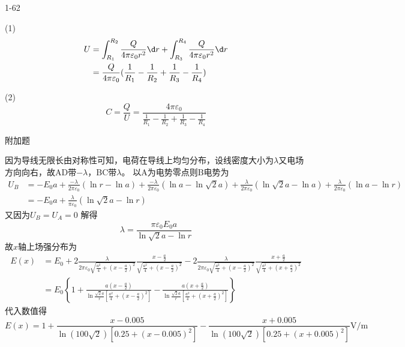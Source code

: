 \documentclass{phyasgn}
\begin{document}
{\heiti\color{red} 1-62}
\begin{sol}
(1)
$$\begin{aligned}
    U&=\int_{R_1}^{R_2}\frac{Q}{4\pi\varepsilon_0r^2}\d r+\int_{R_3}^{R_4}\frac{Q}{4\pi\varepsilon_0r^2}\d r\\
    &=\frac{Q}{4\pi\varepsilon_0}(\frac{1}{R_1}-\frac{1}{R_2}+\frac{1}{R_3}-\frac{1}{R_4})
\end{aligned}$$\par
(2)$$
C=\frac{Q}{U}=\frac{4\pi\varepsilon_0}{\frac{1}{R_1}-\frac{1}{R_2}+\frac{1}{R_3}-\frac{1}{R_4}}
$$
\end{sol}\par

{\heiti\color{red} 附加题}
\begin{sol}
\begin{figure}[!h]
\end{figure}
因为导线无限长由对称性可知，电荷在导线上均匀分布，设线密度大小为$\lambda$又电场方向向右，故AD带$-\lambda$，BC带$\lambda$。
以A为电势零点则B电势为
$$\begin{aligned}
    U_B&=-E_0a+\frac{-\lambda}{2\pi\varepsilon_0}(\ln r-\ln a)+\frac{-\lambda}{2\pi\varepsilon_0}(\ln a-\ln \sqrt{2}a)+\frac{\lambda}{2\pi\varepsilon_0}(\ln \sqrt{2}a-\ln a)+\frac{\lambda}{2\pi\varepsilon_0}(\ln a-\ln r)\\
    &=-E_0a+\frac{\lambda}{\pi\varepsilon_0}(\ln\sqrt{2}a-\ln r)
\end{aligned}$$
又因为$U_B=U_A=0$
解得$$
\lambda=\frac{\pi\varepsilon_0E_0a}{\ln\sqrt{2}a-\ln r}
$$
故$x$轴上场强分布为
$$\begin{aligned}
    E(x)&=E_0+2\frac{\lambda}{2\pi\varepsilon_0\sqrt{\frac{a^2}{4}+(x-\frac{a}{2})^2}}\frac{x-\frac{a}{2}}{\sqrt{\frac{a^2}{4}+(x-\frac{a}{2})^2}}-2\frac{\lambda}{2\pi\varepsilon_0\sqrt{\frac{a^2}{4}+(x-\frac{a}{2})^2}}\frac{x+\frac{a}{2}}{\sqrt{\frac{a^2}{4}+(x+\frac{a}{2})^2}}\\
    &=E_0\left \{ 1+\frac{a(x-\frac{a}{2}) }{\ln \frac{\sqrt{2}a }{r}[\frac{a^2}{4}+(x-\frac{a}{2} )^2]  } -\frac{a(x+\frac{a}{2}) }{\ln \frac{\sqrt{2}a }{r}[\frac{a^2}{4}+(x+\frac{a}{2} )^2  ]} \right \} 
\end{aligned}$$
代入数值得
$$E(x)=1+\frac{x-0.005}{\ln (100\sqrt{2})[0.25+(x-0.005 )^2]  } -\frac{x+0.005}{\ln (100\sqrt{2})[0.25+(x+0.005 )^2] }\mathrm{V/m}$$
\end{sol}\par
\end{document}

